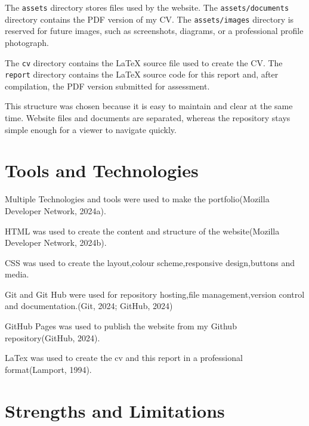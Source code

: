 \documentclass[12pt, a4paper]{article}
\begin{document}
The \texttt{assets} directory stores files used by the website. The
\texttt{assets/documents} directory contains the PDF version of my CV. The
\texttt{assets/images} directory is reserved for future images, such as
screenshots, diagrams, or a professional profile photograph.

The \texttt{cv} directory contains the LaTeX source file used to create the
CV. The \texttt{report} directory contains the LaTeX source code for this
report and, after compilation, the PDF version submitted for assessment.

This structure was chosen because it is easy to maintain and clear at the same
time. Website files and documents are separated, whereas the repository stays
simple enough for a viewer to navigate quickly.

\section{Tools and Technologies}

Multiple Technologies and tools were used to make the portfolio(Mozilla Developer Network, 2024a).

HTML was used to create the content and structure of the website(Mozilla Developer Network, 2024b).

CSS was used to create the layout,colour scheme,responsive design,buttons and media.

Git and Git Hub were used for repository hosting,file management,version control and documentation.(Git, 2024; GitHub, 2024)

GitHub Pages was used to publish the website from my Github repository(GitHub, 2024).

LaTex was used to create the cv and this report in a professional format(Lamport, 1994).


\section{Strengths and Limitations}
\end{document}
